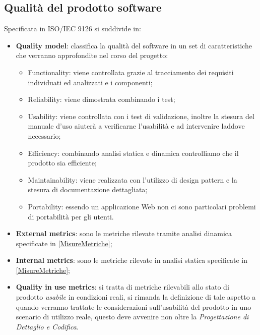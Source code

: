 	\subsection{Qualità del prodotto software}
	\label{appendice-qualitaDelProdotto}
	Specificata in ISO/IEC 9126 si suddivide in:
	
	\begin{itemize}
		\item \textbf{Quality model}: classifica la qualità del software in un set di caratteristiche che verranno approfondite nel corso del progetto:
			
		\begin{itemize}
			\item Functionality: viene controllata grazie al tracciamento dei requisiti individuati ed analizzati e i componenti;
			\item Reliability: viene dimostrata combinando i test;
			\item Usability: viene controllata con i test di validazione, inoltre la stesura del manuale d'uso aiuterà a verificarne l'usabilità e ad intervenire laddove necessario;
			\item Efficiency: combinando analisi statica e dinamica controlliamo che il prodotto sia efficiente;
			\item Maintainability: viene realizzata con l'utilizzo di design pattern e la stesura di documentazione dettagliata;
			\item Portability: essendo  un applicazione Web non ci sono particolari problemi di portabilità per gli utenti.
		\end{itemize}

		\item \textbf{External metrics}: sono le metriche rilevate tramite analisi dinamica specificate in \ref{MisureMetriche};
		\item \textbf{Internal metrics}: sono le metriche rilevate in analisi statica specificate in \ref{MisureMetriche};
		\item \textbf{Quality in use metrics}: si tratta di metriche rilevabili allo stato di prodotto \emph{usabile} in condizioni reali, si rimanda la definizione di tale aspetto a quando verranno trattate le considerazioni sull'usabilità del prodotto in uno scenario di utilizzo reale, questo deve avvenire non oltre la \emph{Progettazione di Dettaglio e Codifica}.
	\end{itemize}

